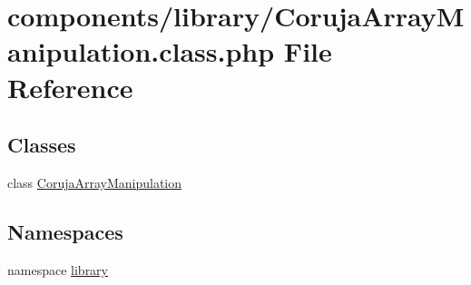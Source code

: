 \hypertarget{_coruja_array_manipulation_8class_8php}{
\section{components/library/CorujaArrayManipulation.class.php File Reference}
\label{_coruja_array_manipulation_8class_8php}
}
\subsection*{Classes}
\begin{CompactItemize}
\item 
class \hyperlink{class_coruja_array_manipulation}{CorujaArrayManipulation}
\end{CompactItemize}
\subsection*{Namespaces}
\begin{CompactItemize}
\item 
namespace \hyperlink{namespacelibrary}{library}
\end{CompactItemize}
